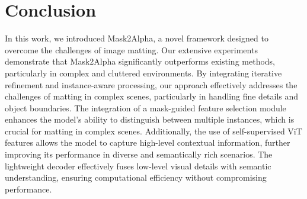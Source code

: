 \section{Conclusion}
In this work, we introduced Mask2Alpha, a novel framework designed to overcome the challenges of image matting. Our extensive experiments demonstrate that Mask2Alpha significantly outperforms existing methods, particularly in complex and cluttered environments. By integrating iterative refinement and instance-aware processing, our approach effectively addresses the challenges of matting in complex scenes, particularly in handling fine details and object boundaries. The integration of a mask-guided feature selection module enhances the model's ability to distinguish between multiple instances, which is crucial for matting in complex scenes. Additionally, the use of self-supervised ViT features allows the model to capture high-level contextual information, further improving its performance in diverse and semantically rich scenarios. The lightweight decoder effectively fuses low-level visual details with semantic understanding, ensuring computational efficiency without compromising performance.